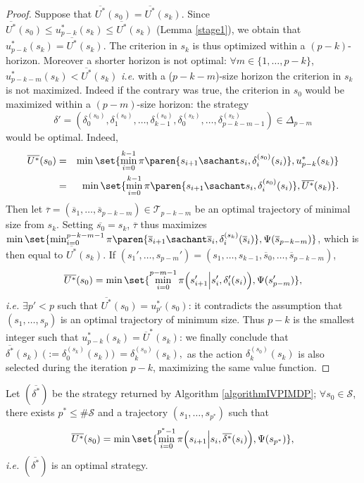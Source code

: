 \begin{proof}
Suppose that $\overline{U^*}(s_0) = \overline{U^*}(s_k)$. 
Since $\overline{U^*}(s_0) \leqslant u^*_{p-k}(s_k) 
\leqslant \overline{U^*}(s_k)$ (Lemma \ref{stage1}),
we obtain that $u^*_{p-k}(s_k) = \overline{U^*}(s_k).$
The criterion in $s_k$ is thus optimized 
within a $(p-k)$-horizon. 
Moreover a shorter horizon is not optimal: 
$\forall m \in \{1, \ldots,p-k \}$, 
$u^*_{p-k-m}(s_k) < \overline{U^*}(s_k)$ 
\textit{i.e.} with a ($p-k-m$)-size horizon 
the criterion in $s_k$ is not maximized. 
Indeed if the contrary was true, 
the criterion in $s_0$ would be maximized 
within a $(p-m)$-size horizon: 
the strategy 
\[ \delta'=(\delta^{(s_0)}_0, \delta^{(s_0)}_1,\ldots,\delta^{(s_0)}_{k-1},\delta^{(s_k)}_0,\ldots,\delta^{(s_k)}_{p-k-m-1}) \in \Delta_{p-m}\] 
would be optimal. 
Indeed,
\begin{eqnarray*}
\overline{U^*}(s_0) & = & \min \set{ \min_{ i=0}^{k-1} \pi \paren{ s_{i+1} \sachant s_i,\delta^{(s_0)}_i(s_i) }, u^*_{p-k}(s_k) } \\
 & = & \min \set{ \min_{i=0}^{k-1} \pi \paren{ s_{i+1} \sachant s_i,\delta^{(s_0)}_i(s_i) }, \overline{U^*}(s_k) }.
\end{eqnarray*}
Then let $\overline{\tau} 
= (\overline{s}_1,\ldots,\overline{s}_{p-k-m}) \in \mathcal{T}_{p-k-m}$ 
be an optimal trajectory of minimal size from $s_k$. 
Setting $\overline{s_0} = s_k$, 
$\overline{\tau}$ thus maximizes 
$\min \set{ \min_{i=0}^{p-k-m-1} \pi \paren{ \overline{s}_{i+1} \sachant \overline{s}_i, \delta^{(s_k)}_i (\overline{s}_i) }, \Psi(\overline{s}_{p-k-m}) }$,
which is then equal to $\overline{U^*}(s_k)$.
If $(s_1',\ldots,s_{p-m}') 
= (s_1,\ldots,s_{k-1},\overline{s}_{0},\ldots,\overline{s}_{p-k-m})$,
\[ \overline{U^*}(s_0) 
= \displaystyle \min \set{ \min_{ i=0}^{ p-m-1 } \pi \Big( s_{i+1}' \Big\vert s_i',\delta_i'(s_i) \Big), \Psi(s_{p-m}') }, \]
\textit{i.e.} $\exists p'<p$ such that $\overline{U^*}(s_0)=u^*_{p'}(s_0)$: 
it contradicts the assumption that $(s_1,\ldots,s_p)$ is an optimal trajectory of minimum size. 
Thus $p-k$ is the smallest integer such that 
$u^*_{p-k}(s_k)=\overline{U}^*(s_k)$: 
we finally conclude that 
$\overline{\delta^*}(s_k) \ \Big(:=\delta^{(s_k)}_0 (s_k)\Big) \ = \delta^{(s_0)}_k(s_k),$
as the action $\delta^{(s_0)}_k(s_k)$
is also selected during the iteration $p-k$,
maximizing the same value function.
\end{proof}
\begin{theorem} 
Let $(\overline{\delta^*})$ be the strategy returned by Algorithm \ref{algorithmIVPIMDP};
$\forall s_0 \in \mathcal{S}$, there exists $p^* \leqslant \# \mathcal{S}$ and a trajectory $(s_1,\ldots,s_{p^*})$ such that 
\[ \overline{U^*}(s_0) 
= \min \set{ \min_{i=0}^{p^{*}-1} \pi \Big( s_{i+1} \Big\vert s_i, \overline{\delta^*}(s_i) \Big), \Psi(s_{p^*}) }, \] 
\textit{i.e.} $(\overline{\delta^*})$ is an optimal strategy.
\end{theorem}
